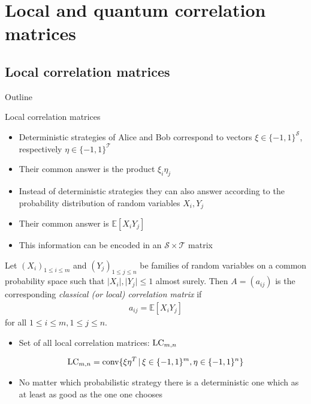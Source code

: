 \section{Local and quantum correlation matrices}
\subsection{Local correlation matrices }
\begin{frame}{Outline}
\tableofcontents[currentsection]
\end{frame}

\begin{frame}[label = LCMot]{Local correlation matrices}
	\begin{itemize}
		\item <1-> Deterministic strategies of Alice and Bob correspond to vectors $ \xi \in \{ -1,1 \}^\mathcal{S} $, respectively $ \eta \in \{ -1,1 \}^\mathcal{T} $
		\item <2-> Their common answer is the product $ \xi_i \eta_j $
		\item <3-> Instead of deterministic strategies they can also answer according to the probability distribution of random variables $ X_i, Y_j $
		\item <4-> Their common answer is $ \mathbb{E}[X_iY_j] $
		\item <5->This information can be encoded in an $ \mathcal{S} \times \mathcal{T} $ matrix 
		\hyperlink{QCMot<4>}{}
	\end{itemize} 
\end{frame}

\begin{frame}
	\begin{definition}
		Let $ (X_i)_{1 \le i \le m } $ and $ (Y_j)_{1 \le j \le n} $ be families of random variables on a common probability space such that $ \vert X_i \vert, \vert Y_j \vert \le 1 $ almost surely. Then $ A=(a_{ij}) $ is the corresponding {\itshape classical (or local) correlation matrix} if 
		\begin{align*}
		a_{ij} = \mathbb{E}[X_iY_j]
		\end{align*}
		for all $ 1 \le i \le m, 1 \le j \le n $.
	\end{definition}
	\pause
	\begin{itemize}
		\item Set of all local correlation matrices: $ \textup{LC}_{m,n} $
	\end{itemize}
	\pause
	\begin{lemma}
		\begin{align*}
			\textup{LC}_{m,n} = \textup{conv} \{  \xi\eta^T \, | \, \xi \in \{-1,1\}^m, \eta \in \{-1,1\}^n     \}
		\end{align*}
		
	\end{lemma}
	\begin{itemize}
		\pause
		\item No matter which probabilistic strategy there is a deterministic one which as at least as good as the one one chooses 
	\end{itemize}
\end{frame}

